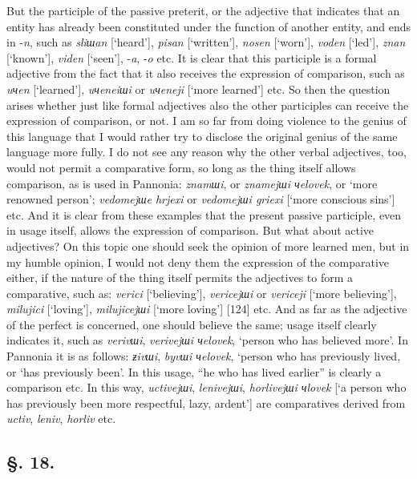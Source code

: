 But the participle of the passive preterit, or the adjective that indicates that an entity has already been constituted under the function of another entity, and ends in -\textit{n}, such as \textit{sliшan} [‘heard’], \textit{pisan} [‘written’], \textit{nosen} [‘worn’], \textit{voden} [‘led’], \textit{znan} [‘known’], \textit{viden} [‘seen’], -\textit{a}, -\textit{o} etc. It is clear that this participle is a formal adjective from the fact that it also receives the expression of comparison, such as \textit{uчen} [‘learned’], \textit{uчeneiшi} or \textit{uчeneji} [‘more learned’] etc. So then the question arises whether just like formal adjectives also the other participles can receive the expression of comparison, or not. I am so far from doing violence to the genius of this language that I would rather try to disclose the original genius of the same language more fully. I do not see any reason why the other verbal adjectives, too, would not permit a comparative form, so long as the thing itself allows comparison, as is used in Pannonia: \textit{znamшi}, or \textit{znamejшi чelovek}, or ‘more renowned person’; \textit{vedomejшe hrjexi} or \textit{vedomejшi griexi} [‘more conscious sins’] etc. And it is clear from these examples that the present passive participle, even in usage itself, allows the expression of comparison. But what about active adjectives? On this topic one should seek the opinion of more learned men, but in my humble opinion, I would not deny them the expression of the comparative either, if the nature of the thing itself permits the adjectives to form a comparative, such as: \textit{verici} [‘believing’], \textit{vericejшi} or \textit{vericeji} [‘more believing’], \textit{milujici} [‘loving’], \textit{milujicejшi} [‘more loving’] [124] etc. And as far as the adjective of the perfect is concerned, one should believe the same; usage itself clearly indicates it, such as \textit{verivшi}, \textit{verivejшi чelovek}, ‘person who has believed more’. In Pannonia it is as follows: \textit{ƶivшi}, \textit{byvшi чelovek}, ‘person who has previously lived, or ‘has previously been’. In this usage, “he who has lived earlier” is clearly a comparison etc. In this way, \textit{uctivejшi}, \textit{lenivejшi}, \textit{horlivejшi чlovek} [‘a person who has previously been more respectful, lazy, ardent’] are comparatives derived from \textit{uctiv}, \textit{leniv}, \textit{horliv} etc.

\subsection*{\hspace*{\fill}§. 18.\hspace*{\fill}}


